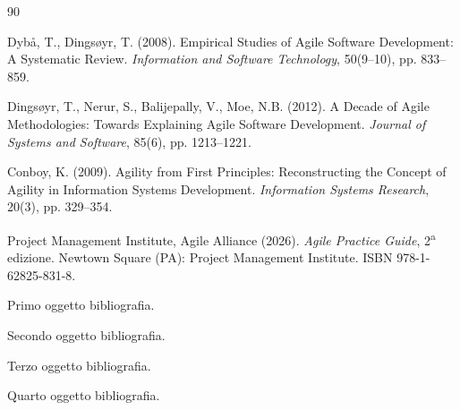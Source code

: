 \begin{thebibliography}{90}

 Dyb\aa, T., Dings\o yr, T. (2008). Empirical Studies of Agile
  Software Development: A Systematic Review. \emph{Information and Software
  Technology}, 50(9--10), pp. 833--859.

 Dings\o yr, T., Nerur, S., Balijepally, V., Moe, N.B.
  (2012). A Decade of Agile Methodologies: Towards Explaining Agile Software
  Development. \emph{Journal of Systems and Software}, 85(6), pp. 1213--1221.

 Conboy, K. (2009). Agility from First Principles:
  Reconstructing the Concept of Agility in Information Systems Development.
  \emph{Information Systems Research}, 20(3), pp. 329--354.


 Project Management Institute, Agile Alliance
  (2026). \emph{Agile Practice Guide}, 2\textsuperscript{a} edizione. Newtown
  Square (PA): Project Management Institute. ISBN 978-1-62825-831-8.


 Primo oggetto bibliografia.

 Secondo oggetto bibliografia.

 Terzo oggetto bibliografia.

 Quarto oggetto bibliografia.

\end{thebibliography}
